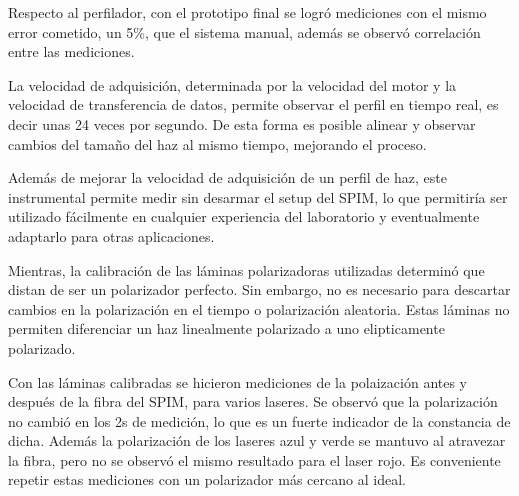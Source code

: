 Respecto al perfilador, con el prototipo final se logró mediciones con el mismo error cometido, un 5\%, que el sistema manual, además se observó correlación entre las mediciones. 

La velocidad de adquisición, determinada por la velocidad del motor y la velocidad de transferencia de datos, permite observar el perfil en tiempo real, es decir unas 24 veces por segundo. De esta forma es posible alinear y observar cambios del tamaño del haz al mismo tiempo, mejorando el proceso.

Además de mejorar la velocidad de adquisición de un perfil de haz, este instrumental permite medir sin desarmar el setup del SPIM, lo que permitiría ser utilizado fácilmente en cualquier experiencia del laboratorio y eventualmente adaptarlo para otras aplicaciones.

Mientras, la calibración de las láminas polarizadoras utilizadas determinó que distan de ser un polarizador perfecto. Sin embargo, no es necesario para descartar cambios en la polarización en el tiempo o polarización aleatoria. Estas láminas no permiten diferenciar un haz linealmente polarizado a uno elipticamente polarizado. 

Con las láminas calibradas se hicieron mediciones de la polaización antes y después de la fibra del SPIM, para varios laseres. Se observó que la polarización no cambió en los 2s de medición, lo que es un fuerte indicador de la constancia de dicha. Además la polarización de los laseres azul y verde se mantuvo al atravezar la fibra, pero no se observó el mismo resultado para el laser rojo. Es conveniente repetir estas mediciones con un polarizador más cercano al ideal.
